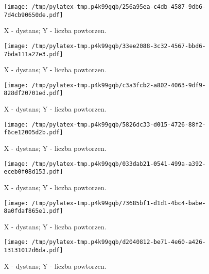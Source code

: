 \documentclass{article}%
\begin{document}
%
\newpage%


\begin{figure}[h]%
\centering%
\texttt{[image: /tmp/pylatex-tmp.p4k99gqb/256a95ea-c4db-4587-9db6-7d4cb90650de.pdf]}%
\caption{X {-} dystans; Y {-} liczba powtorzen.}%
\end{figure}

%
\newpage%


\begin{figure}[h]%
\centering%
\texttt{[image: /tmp/pylatex-tmp.p4k99gqb/33ee2088-3c32-4567-bbd6-7bda111a27e3.pdf]}%
\caption{X {-} dystans; Y {-} liczba powtorzen.}%
\end{figure}

%
\newpage%


\begin{figure}[h]%
\centering%
\texttt{[image: /tmp/pylatex-tmp.p4k99gqb/c3a3fcb2-a802-4063-9df9-828df20701ed.pdf]}%
\caption{X {-} dystans; Y {-} liczba powtorzen.}%
\end{figure}

%
\newpage%


\begin{figure}[h]%
\centering%
\texttt{[image: /tmp/pylatex-tmp.p4k99gqb/5826dc33-d015-4726-88f2-f6ce12005d2b.pdf]}%
\caption{X {-} dystans; Y {-} liczba powtorzen.}%
\end{figure}

%
\newpage%


\begin{figure}[h]%
\centering%
\texttt{[image: /tmp/pylatex-tmp.p4k99gqb/033dab21-0541-499a-a392-eceb0f08d153.pdf]}%
\caption{X {-} dystans; Y {-} liczba powtorzen.}%
\end{figure}

%
\newpage%


\begin{figure}[h]%
\centering%
\texttt{[image: /tmp/pylatex-tmp.p4k99gqb/73685bf1-d1d1-4bc4-babe-8a0fdaf865e1.pdf]}%
\caption{X {-} dystans; Y {-} liczba powtorzen.}%
\end{figure}

%
\newpage%


\begin{figure}[h]%
\centering%
\texttt{[image: /tmp/pylatex-tmp.p4k99gqb/d2040812-be71-4e60-a426-13131012d6da.pdf]}%
\caption{X {-} dystans; Y {-} liczba powtorzen.}%
\end{figure}
\end{document}
